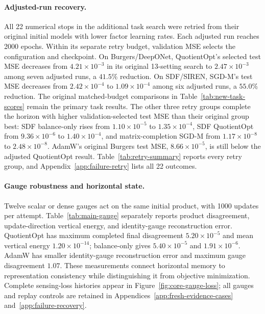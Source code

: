 \paragraph{Adjusted-run recovery.}
All 22 numerical stops in the additional task search were retried
from their original initial models with lower factor learning rates.
Each adjusted run reaches 2000 epochs. Within its separate retry
budget, validation MSE selects the configuration and checkpoint.
On Burgers/DeepONet, QuotientOpt's selected test MSE decreases from
$4.21\times10^{-3}$ in its original 13-setting search to
$2.47\times10^{-3}$ among seven adjusted runs, a $41.5\%$ reduction.
On SDF/SIREN, SGD-M's test MSE decreases from $2.42\times10^{-4}$
to $1.09\times10^{-4}$ among six adjusted runs, a $55.0\%$
reduction. The original matched-budget comparisons in
Table~\ref{tab:new-task-scores} remain the primary task results.
The other three retry groups complete the horizon with higher
validation-selected test MSE than their original group best:
SDF balance-only rises from $1.10\times10^{-5}$ to
$1.35\times10^{-4}$, SDF QuotientOpt from $9.36\times10^{-6}$ to
$1.40\times10^{-4}$, and matrix-completion SGD-M from
$1.17\times10^{-8}$ to $2.48\times10^{-8}$.
AdamW's original Burgers test MSE, $8.66\times10^{-5}$,
is still below the adjusted QuotientOpt result.
Table~\ref{tab:retry-summary} reports every retry group, and
Appendix~\ref{app:failure-retry} lists all 22 outcomes.



\paragraph{Gauge robustness and horizontal state.}
Twelve scalar or dense gauges act on the same initial product, with
1000 updates per attempt. Table~\ref{tab:main-gauge} separately reports
product disagreement, update-direction vertical energy, and
identity-gauge reconstruction error. QuotientOpt has maximum completed
final disagreement $5.20\times10^{-5}$ and mean vertical energy
$1.20\times10^{-14}$; balance-only gives $5.40\times10^{-5}$ and
$1.91\times10^{-6}$. AdamW has smaller identity-gauge reconstruction
error and maximum gauge disagreement $1.07$. These measurements connect
horizontal memory to representation consistency while distinguishing
it from objective minimization. Complete sensing-loss histories appear
in Figure~\ref{fig:core-gauge-loss}; all gauges and replay controls are
retained in Appendices~\ref{app:fresh-evidence-cases}
and~\ref{app:failure-recovery}.

